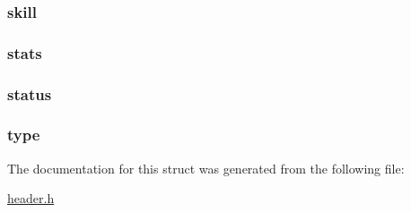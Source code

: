 \hypertarget{structt__character_ae7aa14804e69b1bc9652c16261da0c9f}{
\subsubsection[{skill}]{ skill}}\label{structt__character_ae7aa14804e69b1bc9652c16261da0c9f}
\hypertarget{structt__character_a29711825af64d428d19df366a5056670}{
\subsubsection[{stats}]{ stats}}\label{structt__character_a29711825af64d428d19df366a5056670}
\hypertarget{structt__character_a3ade6b90793e915ca28b52fb70e58e3f}{
\subsubsection[{status}]{ status}}\label{structt__character_a3ade6b90793e915ca28b52fb70e58e3f}
\hypertarget{structt__character_a3b5fecb9824668aab778f82005089942}{
\subsubsection[{type}]{ type}}\label{structt__character_a3b5fecb9824668aab778f82005089942}


The documentation for this struct was generated from the following file\-:\begin{DoxyCompactItemize}
\item 
\hyperlink{header_8h}{header.\-h}\end{DoxyCompactItemize}
